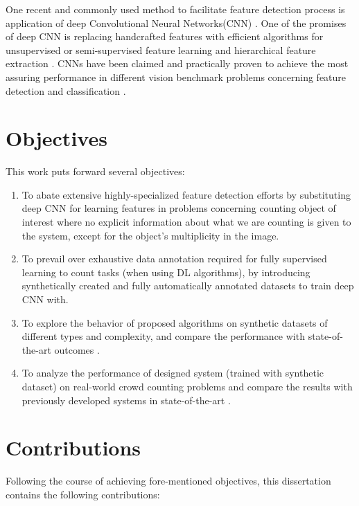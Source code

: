 \indent One recent and commonly used method to facilitate feature detection process is application of deep Convolutional Neural Networks(CNN) \cite{szegedy2015going, krizhevsky2012imagenet, lecun1995convolutional, sermanet2013overfeat, ji20133d, taylor2010convolutional}. One of the promises of deep CNN is replacing handcrafted features with efficient algorithms for unsupervised or semi-supervised feature learning and hierarchical feature extraction \cite{song2013hierarchical}. CNNs have been claimed and practically proven to achieve the most assuring performance in different vision benchmark problems concerning feature detection and classification \cite{ciresan2011flexible, szegedy2015going, ciresan2012multi}. 

\section{Objectives}
This work puts forward several objectives:
\begin{enumerate}

\item To abate extensive highly-specialized feature detection efforts by substituting deep CNN for learning features in problems concerning counting object of interest where no explicit information about what we are counting is given to the system, except for the object's multiplicity in the image.

\item To prevail over exhaustive data annotation required for fully supervised learning to count tasks (when using DL algorithms), by introducing synthetically created and fully automatically annotated datasets to train deep CNN with.   

\item To explore the behavior of proposed algorithms on synthetic datasets of different types and complexity, and compare the performance with state-of-the-art outcomes \cite{segui2015learning}.   

\item To analyze the performance of designed system (trained with synthetic dataset) on real-world crowd counting problems and compare the results with previously developed systems in state-of-the-art \cite{chan2008privacy}.   
 

\end{enumerate}
\section{Contributions}
Following the course of achieving fore-mentioned objectives, this dissertation contains the following contributions:

